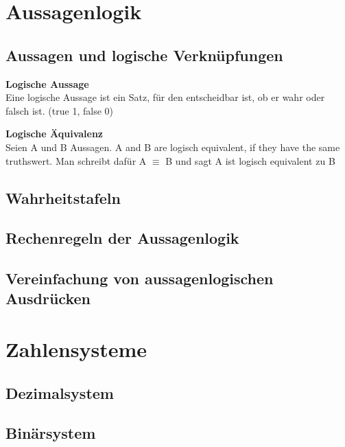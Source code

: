 \documentclass[a4paper,10pt]{article}
\begin{document}
\section{Aussagenlogik}


\subsection{Aussagen und logische Verknüpfungen}


\begin{definitionbox}
\textbf{Logische Aussage} \\
Eine logische Aussage ist ein Satz, für den entscheidbar ist, ob er wahr oder falsch ist. (true 1, false 0)
\end{definitionbox}

\begin{definitionbox}
\textbf{Logische Äquivalenz} \\
Seien A und B Aussagen. A and B are logisch equivalent, if they have the same truthswert. Man schreibt dafür A $\equiv$ B und sagt A ist logisch equivalent zu B
\end{definitionbox}

\subsection{Wahrheitstafeln}
\subsection{Rechenregeln der Aussagenlogik}
\subsection{Vereinfachung von aussagenlogischen Ausdrücken}



\section{Zahlensysteme}

\subsection{Dezimalsystem}
\subsection{Binärsystem}
\end{document}
